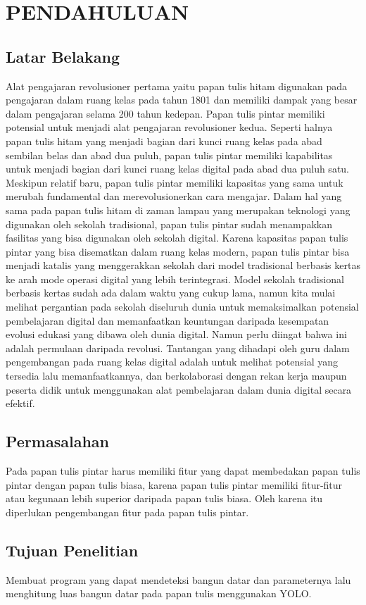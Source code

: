 \section{PENDAHULUAN}

\subsection{Latar Belakang}

Alat pengajaran revolusioner pertama yaitu papan tulis hitam digunakan pada pengajaran dalam ruang kelas pada tahun 1801 dan memiliki dampak yang besar dalam pengajaran selama 200 tahun kedepan. Papan tulis pintar memiliki potensial untuk menjadi alat pengajaran revolusioner kedua. Seperti halnya papan tulis hitam yang menjadi bagian dari kunci ruang kelas pada abad sembilan belas dan abad dua puluh, papan tulis pintar memiliki kapabilitas untuk menjadi bagian dari kunci ruang kelas digital pada abad dua puluh satu. Meskipun relatif baru, papan tulis pintar memiliki kapasitas yang sama untuk merubah fundamental dan merevolusionerkan cara mengajar.
Dalam hal yang sama pada papan tulis hitam di zaman lampau yang merupakan teknologi yang digunakan oleh sekolah tradisional, papan tulis pintar sudah menampakkan fasilitas yang bisa digunakan oleh sekolah digital. Karena kapasitas papan tulis pintar yang bisa disematkan dalam ruang kelas modern, papan tulis pintar bisa menjadi katalis yang menggerakkan sekolah dari model tradisional berbasis kertas ke arah mode operasi digital yang lebih terintegrasi. Model sekolah tradisional berbasis kertas sudah ada dalam waktu yang cukup lama, namun kita mulai melihat pergantian pada sekolah diseluruh dunia untuk memaksimalkan potensial pembelajaran digital dan memanfaatkan keuntungan daripada kesempatan evolusi edukasi yang dibawa oleh dunia digital.
Namun perlu diingat bahwa ini adalah permulaan daripada revolusi. Tantangan yang dihadapi oleh guru dalam pengembangan pada ruang kelas digital adalah untuk melihat potensial yang tersedia lalu memanfaatkannya, dan berkolaborasi dengan rekan kerja maupun peserta didik untuk menggunakan alat pembelajaran dalam dunia digital secara efektif.



\subsection{Permasalahan}

Pada papan tulis pintar harus memiliki fitur yang dapat membedakan papan tulis pintar dengan papan tulis biasa, karena papan tulis pintar memiliki fitur-fitur atau kegunaan lebih superior daripada papan tulis biasa. Oleh karena itu diperlukan pengembangan fitur pada papan tulis pintar. 


\subsection{Tujuan Penelitian}

Membuat program yang dapat mendeteksi bangun datar dan parameternya lalu menghitung luas bangun datar pada papan tulis menggunakan YOLO.